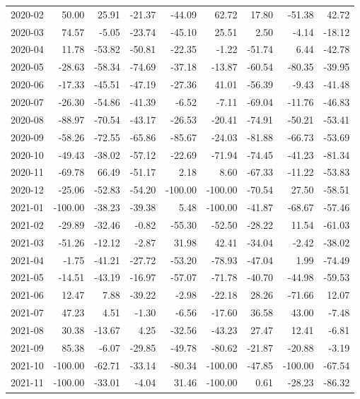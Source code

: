 \begin{table}[ht]
\begin{tabular}{lrrrrrrrr}
  2020-02 & 50.00 & 25.91 & -21.37 & -44.09 & 62.72 & 17.80 & -51.38 & 42.72 \\ 
  2020-03 & 74.57 & -5.05 & -23.74 & -45.10 & 25.51 & 2.50 & -4.14 & -18.12 \\ 
  2020-04 & 11.78 & -53.82 & -50.81 & -22.35 & -1.22 & -51.74 & 6.44 & -42.78 \\ 
  2020-05 & -28.63 & -58.34 & -74.69 & -37.18 & -13.87 & -60.54 & -80.35 & -39.95 \\ 
  2020-06 & -17.33 & -45.51 & -47.19 & -27.36 & 41.01 & -56.39 & -9.43 & -41.48 \\ 
  2020-07 & -26.30 & -54.86 & -41.39 & -6.52 & -7.11 & -69.04 & -11.76 & -46.83 \\ 
  2020-08 & -88.97 & -70.54 & -43.17 & -26.53 & -20.41 & -74.91 & -50.21 & -53.41 \\ 
  2020-09 & -58.26 & -72.55 & -65.86 & -85.67 & -24.03 & -81.88 & -66.73 & -53.69 \\ 
  2020-10 & -49.43 & -38.02 & -57.12 & -22.69 & -71.94 & -74.45 & -41.23 & -81.34 \\ 
  2020-11 & -69.78 & 66.49 & -51.17 & 2.18 & 8.60 & -67.33 & -11.22 & -53.83 \\ 
  2020-12 & -25.06 & -52.83 & -54.20 & -100.00 & -100.00 & -70.54 & 27.50 & -58.51 \\ 
  2021-01 & -100.00 & -38.23 & -39.38 & 5.48 & -100.00 & -41.87 & -68.67 & -57.46 \\ 
  2021-02 & -29.89 & -32.46 & -0.82 & -55.30 & -52.50 & -28.22 & 11.54 & -61.03 \\ 
  2021-03 & -51.26 & -12.12 & -2.87 & 31.98 & 42.41 & -34.04 & -2.42 & -38.02 \\ 
  2021-04 & -1.75 & -41.21 & -27.72 & -53.20 & -78.93 & -47.04 & 1.99 & -74.49 \\ 
  2021-05 & -14.51 & -43.19 & -16.97 & -57.07 & -71.78 & -40.70 & -44.98 & -59.53 \\ 
  2021-06 & 12.47 & 7.88 & -39.22 & -2.98 & -22.18 & 28.26 & -71.66 & 12.07 \\ 
  2021-07 & 47.23 & 4.51 & -1.30 & -6.56 & -17.60 & 36.58 & 43.00 & -7.48 \\ 
  2021-08 & 30.38 & -13.67 & 4.25 & -32.56 & -43.23 & 27.47 & 12.41 & -6.81 \\ 
  2021-09 & 85.38 & -6.07 & -29.85 & -49.78 & -80.62 & -21.87 & -20.88 & -3.19 \\ 
  2021-10 & -100.00 & -62.71 & -33.14 & -80.34 & -100.00 & -47.85 & -100.00 & -67.54 \\ 
  2021-11 & -100.00 & -33.01 & -4.04 & 31.46 & -100.00 & 0.61 & -28.23 & -86.32 \\ 

\end{tabular}
\end{table}
